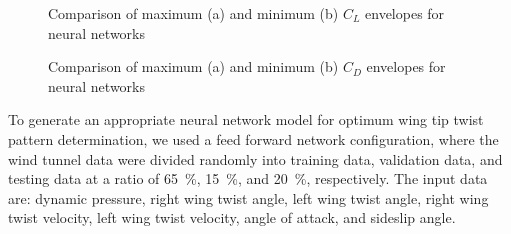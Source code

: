 \documentclass[11pt]{ucthesis}
\begin{document}
\begin{figure}[thpb]
\centering
{} 
\caption{Comparison of maximum (a) and minimum (b) $C_L$ envelopes for neural networks}
\label{fig:NNCLMax}
\end{figure}

\begin{figure}[thpb]
\centering
{} 
\caption{Comparison of maximum (a) and minimum (b) $C_D$ envelopes for neural networks}
\label{fig:NNCDMax}
\end{figure}

To generate an appropriate neural network model for optimum wing tip twist pattern determination, we used a feed forward network configuration, where the wind tunnel data were divided randomly into training data, validation data, and testing data at a ratio of 65~\%, 15~\%, and 20~\%, respectively. The input data are: dynamic pressure, right wing twist angle, left wing twist angle, right wing twist velocity, left wing twist velocity, angle of attack, and sideslip angle.
\end{document}
